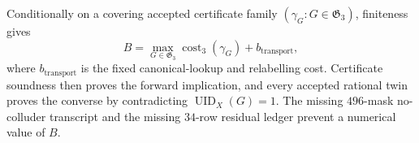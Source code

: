 Conditionally on a covering accepted certificate family \((\gamma_G:G\in\mathfrak G_3)\), finiteness gives
\[
B=\max_{G\in\mathfrak G_3}\operatorname{cost}_3(\gamma_G)+b_{\mathrm{transport}},
\]
where \(b_{\mathrm{transport}}\) is the fixed canonical-lookup and relabelling cost. Certificate soundness then proves the forward implication, and every accepted rational twin proves the converse by contradicting \(\operatorname{UID}_X(G)=1\). The missing \(496\)-mask no-colluder transcript and the missing \(34\)-row residual ledger prevent a numerical value of \(B\).